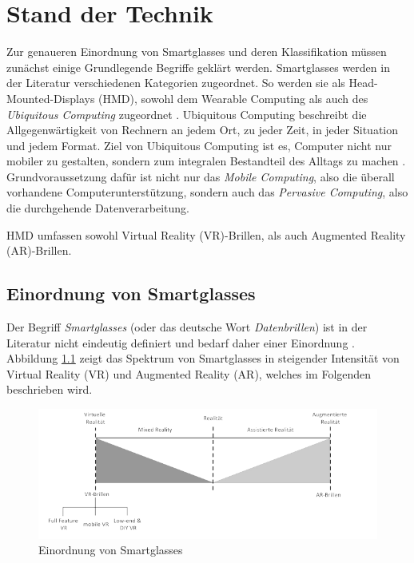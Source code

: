 %
%
%
%
%
%
\chapter{Stand der Technik}
\label{sec:Stand_der_Technik}
Zur genaueren Einordnung von Smartglasses und deren Klassifikation müssen zunächst einige Grundlegende Begriffe geklärt werden. Smartglasses werden in der Literatur verschiedenen Kategorien zugeordnet. So werden sie als Head-Mounted-Displays (HMD), sowohl dem Wearable Computing als auch des \emph{Ubiquitous Computing} zugeordnet \cite[S.~20]{ThomasDirkMetzgerHelmutNiegemannHrsg2018}. Ubiquitous Computing beschreibt die Allgegenwärtigkeit von Rechnern an jedem Ort, zu jeder Zeit, in jeder Situation und jedem Format. Ziel von Ubiquitous Computing ist es, Computer nicht nur mobiler zu gestalten, sondern zum integralen Bestandteil des Alltags zu machen \cite[S.~24]{Schwenke2016}. Grundvoraussetzung dafür ist nicht nur das \emph{Mobile Computing}, also die überall vorhandene Computerunterstützung, sondern auch das \emph{Pervasive Computing}, also die durchgehende Datenverarbeitung. 

HMD umfassen sowohl Virtual Reality (VR)-Brillen, als auch Augmented Reality (AR)-Brillen.
%
%
%
%
%
%
\section{Einordnung von Smartglasses}
\label{sec:Einordnung_von_Smartglasses}
Der Begriff \emph{Smartglasses} (oder das deutsche Wort \emph{Datenbrillen}) ist in der Literatur nicht eindeutig definiert und bedarf daher einer Einordnung \cite[S.~26]{Schwenke2016}. Abbildung \ref{fig:Einordnung_Von_Smartglasses} zeigt das Spektrum von Smartglasses in steigender Intensität von Virtual Reality (VR) und Augmented Reality (AR), welches im Folgenden beschrieben wird.
%
\begin{figure}[htbp]
    \centering
    \includegraphics[width=1\textwidth]{data/bilder/VRvsAR.pdf}
    \caption{Einordnung von Smartglasses}
    \label{fig:Einordnung_Von_Smartglasses}
\end{figure}
%
